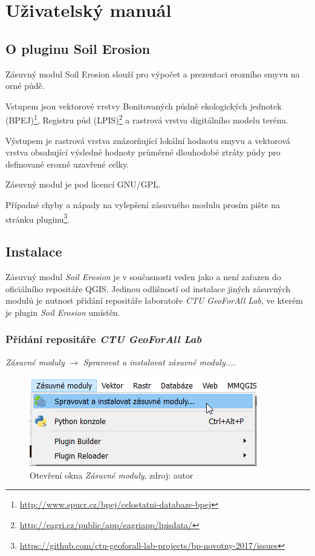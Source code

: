 \chapter{Uživatelský manuál}
\label{6-manual}
\section{O pluginu Soil Erosion}
\label{o_pluginu} Zásuvný modul Soil Erosion slouží pro výpočet a
prezentaci erozního smyvu na orné půdě.

Vstupem jsou vektorové vrstvy Bonitovaných půdně ekologických jednotek
(BPEJ)\footnote{\url{http://www.spucr.cz/bpej/celostatni-databaze-bpej}},
Registru půd
(LPIS)\footnote{\url{http://eagri.cz/public/app/eagriapp/lpisdata/}} a
rastrová vrstva digitálního modelu terénu.

Výstupem je rastrová vrstva znázorňující lokální hodnotu smyvu a
vektorová vrstva obsahující výsledné hodnoty průměrné dlouhodobé
ztráty půdy pro definované erozně uzavřené celky.

Zásuvný modul je pod licencí GNU/GPL.

Případné chyby a nápady na vylepšení zásuvného modulu prosím pište na
stránku
pluginu\footnote{\url{https://github.com/ctu-geoforall-lab-projects/bp-novotny-2017/issues}}.

\section{Instalace}
\label{manual_instalace} Zásuvný modul \textit{Soil Erosion} je v
současnosti veden jako  a není zařazen do
oficiálního repositáře QGIS. Jedinou odlišností od instalace jiných
zásuvných modulů je nutnost přidání repositáře laboratoře
\textit{CTU GeoForAll Lab}, ve kterém je plugin \textit{Soil Erosion}
umístěn.


\subsection{Přídání repositáře \textit{CTU GeoForAll Lab}} \textit{Zásuvné
moduly} $\rightarrow$ \textit{Spravovat a instalovat zásuvné
moduly...}.

	\begin{figure}[H] \centering
		\includegraphics[width=.6\textwidth]{./pictures/otevreni_okna_zasuvne_moduly.png}
		\caption[Otevření okna \textit{Zásuvné
moduly}]{Otevření okna \textit{Zásuvné moduly}, zdroj: autor}
		\label{fig:manual_otevreni_okna_zasuvne_moduly}
 	\end{figure}
 	
